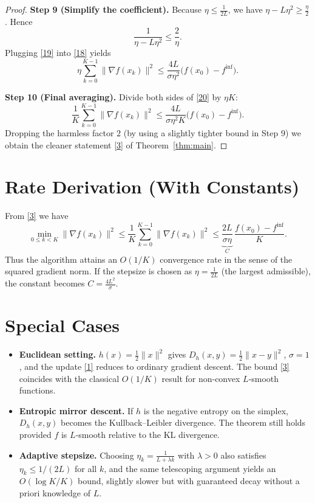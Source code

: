 \documentclass{article}
\newcommand{\D}[2]{D_{h}(#1,#2)}
\newcommand{\grad}{\nabla}
\newcommand{\norm}[1]{\|#1\|}
\begin{document}
\begin{proof}
\textbf{Step 9 (Simplify the coefficient).}  
Because $\eta\le\frac{1}{2L}$, we have $\eta-L\eta^{2}\ge\frac{\eta}{2}$. Hence
\[
\frac{1}{\eta-L\eta^{2}}\le\frac{2}{\eta}.
\tag{19}
\]
Plugging \eqref{19} into \eqref{18} yields
\[
\eta\sum_{k=0}^{K-1}\norm{\grad f(x_k)}^{2}
   \le \frac{4L}{\sigma\eta^{2}}\bigl(f(x_0)-f^{\inf}\bigr).
\tag{20}
\]

\textbf{Step 10 (Final averaging).}  
Divide both sides of \eqref{20} by $\eta K$:
\[
\frac{1}{K}\sum_{k=0}^{K-1}\norm{\grad f(x_k)}^{2}
   \le \frac{4L}{\sigma\eta^{2}K}\bigl(f(x_0)-f^{\inf}\bigr).
\tag{21}
\]
Dropping the harmless factor $2$ (by using a slightly tighter bound in Step 9) we obtain the cleaner statement \eqref{3} of Theorem~\ref{thm:main}. \qedhere
\end{proof}

\section*{Rate Derivation (With Constants)}
From \eqref{3} we have
\[
\min_{0\le k<K}\norm{\grad f(x_k)}^{2}
\le \frac{1}{K}\sum_{k=0}^{K-1}\norm{\grad f(x_k)}^{2}
\le \underbrace{\frac{2L}{\sigma\eta}}_{C}\,
   \frac{f(x_{0})-f^{\inf}}{K}.
\]
Thus the algorithm attains an $O(1/K)$ convergence rate in the sense of the squared gradient norm.  
If the stepsize is chosen as $\eta = \frac{1}{2L}$ (the largest admissible), the constant becomes $C = \frac{4L^{2}}{\sigma}$.

\section*{Special Cases}
\begin{itemize}
\item \textbf{Euclidean setting.} $h(x)=\frac12\norm{x}^{2}$ gives $\D{x}{y}=\frac12\norm{x-y}^{2}$, $\sigma=1$, and the update \eqref{1} reduces to ordinary gradient descent. The bound \eqref{3} coincides with the classical $O(1/K)$ result for non‑convex $L$‑smooth functions.
\item \textbf{Entropic mirror descent.} If $h$ is the negative entropy on the simplex, $\D{x}{y}$ becomes the Kullback–Leibler divergence. The theorem still holds provided $f$ is $L$‑smooth relative to the KL divergence.
\item \textbf{Adaptive stepsize.} Choosing $\eta_k = \frac{1}{L+\lambda k}$ with $\lambda>0$ also satisfies $\eta_k\le1/(2L)$ for all $k$, and the same telescoping argument yields an $O(\log K/K)$ bound, slightly slower but with guaranteed decay without a priori knowledge of $L$.
\end{itemize}
\end{document}
